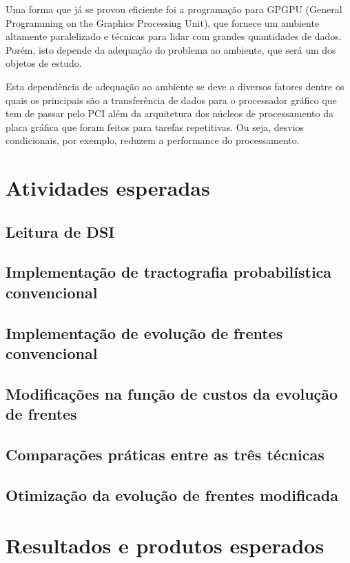 \documentclass[a4paper,11pt]{report}
\begin{document}
  Uma forma que já se provou eficiente foi a programação para GPGPU (General Programming on the Graphics Processing Unit), que fornece um ambiente altamente paralelizado e técnicas para lidar com grandes quantidades de dados. Porém, isto depende da adequação do problema ao ambiente, que será um dos objetos de estudo.
  
  Esta dependência de adequação ao ambiente se deve a diversos fatores dentre os quais os principais são a transferência de dados para o processador gráfico que tem de passar pelo PCI além da arquitetura dos núcleos de processamento da placa gráfica que foram feitos para tarefas repetitivas. Ou seja, desvios condicionais, por exemplo, reduzem a performance do processamento.

\chapter{Atividades esperadas}
  \section{Leitura de DSI}
  
  \section{Implementação de tractografia probabilística convencional}
  
  \section{Implementação de evolução de frentes convencional}
  
  \section{Modificações na função de custos da evolução de frentes}
  
  \section{Comparações práticas entre as três técnicas}
  
  \section{Otimização da evolução de frentes modificada}

\chapter{Resultados e produtos esperados}
\end{document}

